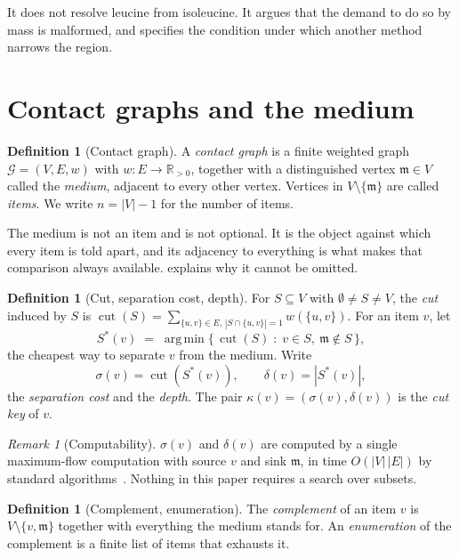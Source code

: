 \documentclass[11pt,a4paper]{article}
\theoremstyle{definition}
\newtheorem{definition}[theorem]{Definition}
\theoremstyle{remark}
\newtheorem{remark}[theorem]{Remark}
\newcommand{\Gph}{\mathcal{G}}              %
\newcommand{\wt}{w}                          %
\newcommand{\med}{\mathfrak{m}}              %
\newcommand{\cut}{\operatorname{cut}}
\newcommand{\sep}{\sigma}                    %
\newcommand{\dep}{\delta}                    %
\newcommand{\key}{\kappa}                    %
\DeclareMathOperator*{\argmin}{arg\,min}
\begin{document}
It does not resolve leucine from isoleucine. It argues that the demand
to do so by mass is malformed, and specifies the condition under which
another method narrows the region.

\section{Contact graphs and the medium}
\label{sec:graph}

\begin{definition}[Contact graph]
\label{def:contact}
A \emph{contact graph} is a finite weighted graph
$\Gph=(V,E,\wt)$ with $\wt:E\to\mathbb{R}_{>0}$, together with a
distinguished vertex $\med\in V$ called the \emph{medium}, adjacent to
every other vertex. Vertices in $V\setminus\{\med\}$ are called
\emph{items}. We write $n=|V|-1$ for the number of items.
\end{definition}

The medium is not an item and is not optional. It is the object against
which every item is told apart, and its adjacency to everything is what
makes that comparison always available.  explains
why it cannot be omitted.

\begin{definition}[Cut, separation cost, depth]
\label{def:cut}
For $S\subseteq V$ with $\emptyset\neq S\neq V$, the \emph{cut} induced
by $S$ is $\cut(S)=\sum_{\{u,v\}\in E,\,|S\cap\{u,v\}|=1}\wt(\{u,v\})$.
For an item $v$, let
\[
  S^{\ast}(v)\;=\;\argmin\{\,\cut(S)\;:\;v\in S,\ \med\notin S\,\},
\]
the cheapest way to separate $v$ from the medium. Write
\[
  \sep(v)=\cut(S^{\ast}(v)),
  \qquad
  \dep(v)=|S^{\ast}(v)|,
\]
the \emph{separation cost} and the \emph{depth}. The pair
$\key(v)=(\sep(v),\dep(v))$ is the \emph{cut key} of $v$.
\end{definition}

\begin{remark}[Computability]
\label{rem:computable}
$\sep(v)$ and $\dep(v)$ are computed by a single maximum-flow
computation with source $v$ and sink $\med$, in time
$O(|V|\,|E|)$ by standard
algorithms~\citep{fordfulkerson1956,goldberg1988new}. Nothing in this
paper requires a search over subsets.
\end{remark}

\begin{definition}[Complement, enumeration]
\label{def:complement}
The \emph{complement} of an item $v$ is $V\setminus\{v,\med\}$ together
with everything the medium stands for. An \emph{enumeration} of the
complement is a finite list of items that exhausts it.
\end{definition}
\end{document}
